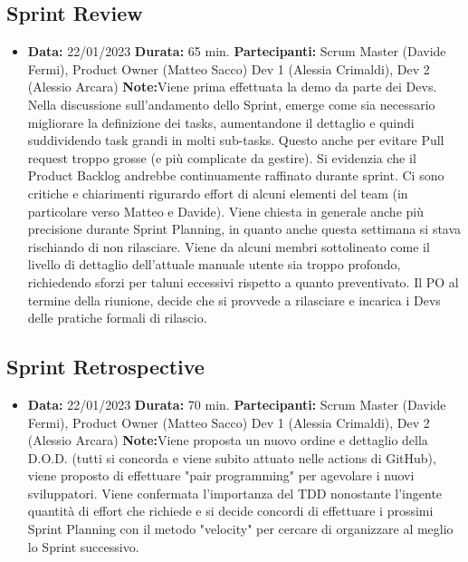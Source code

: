 \documentclass{article}
\begin{document}
    \subsection{Sprint Review}
    \begin{itemize}
        \item \textbf{Data:} 22/01/2023
        \newline \textbf{Durata:} 65 min.
        \newline \textbf{Partecipanti:} Scrum Master (Davide Fermi), Product Owner (Matteo Sacco) Dev 1 (Alessia Crimaldi), Dev 2 (Alessio Arcara)
        \newline \textbf{Note:}Viene prima effettuata la demo da parte dei Devs. Nella discussione sull'andamento dello Sprint, emerge come sia necessario migliorare la definizione dei tasks, aumentandone il dettaglio e quindi suddividendo task grandi in molti sub-tasks. Questo anche per evitare Pull request troppo grosse (e più complicate da gestire). Si evidenzia che il Product Backlog andrebbe continuamente raffinato durante sprint. Ci sono critiche e chiarimenti rigurardo effort di alcuni elementi del team (in particolare verso Matteo e Davide). Viene chiesta in generale anche più precisione durante Sprint Planning, in quanto anche questa settimana si stava rischiando di non rilasciare. Viene da alcuni membri sottolineato come il livello di dettaglio dell'attuale manuale utente sia troppo profondo, richiedendo sforzi per taluni eccessivi rispetto a quanto preventivato. Il PO al termine della riunione, decide che si provvede a rilasciare e incarica i Devs delle pratiche formali di rilascio.
    \end{itemize}

    \subsection{Sprint Retrospective}
    \begin{itemize}
        \item \textbf{Data:} 22/01/2023
        \newline \textbf{Durata:} 70 min.
        \newline \textbf{Partecipanti:} Scrum Master (Davide Fermi), Product Owner (Matteo Sacco) Dev 1 (Alessia Crimaldi), Dev 2 (Alessio Arcara)
        \newline \textbf{Note:}Viene proposta un nuovo ordine e dettaglio della D.O.D. (tutti si concorda e viene subito attuato nelle actions di GitHub), viene proposto di effettuare "pair programming" per agevolare i nuovi sviluppatori. Viene confermata l'importanza del TDD nonostante l'ingente quantità di effort che richiede e si decide concordi di effettuare i prossimi Sprint Planning con il metodo "velocity" per cercare di organizzare al meglio lo Sprint successivo.
    \end{itemize}
\end{document}
